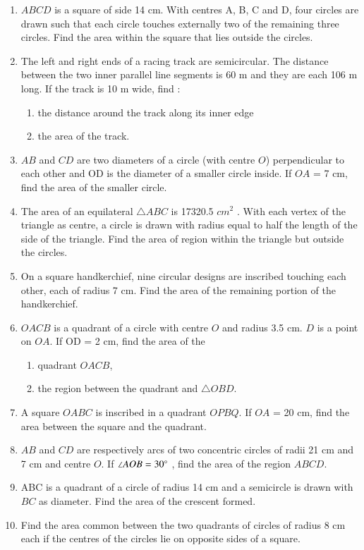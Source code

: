\begin{enumerate}[label=\thesection.\arabic*.,ref=\thesection.\theenumi]
%
\item $ABCD$ is a square of side 14 cm. With centres A, B, C and D, four circles are drawn such that each circle touches externally two of the remaining three circles. Find the area within the square that lies outside the circles.
\item The left and right ends of a racing track are semicircular.
The distance between the two inner parallel line segments is 60 m and they are each 106 m long. If the track is 10 m wide, find : 
\begin{enumerate}
\item the distance around the track along its inner edge 
\item the area of the track.
\end{enumerate}
\item $AB$ and $CD$ are two diameters of a circle (with centre $O$) perpendicular to each other and OD is the diameter of a  smaller circle inside. If $OA$ = 7 cm, find the area of the smaller circle.
\item The area of an equilateral $\triangle ABC$ is 17320.5 $cm^2$
. With each vertex of the triangle as centre, a circle is drawn with radius equal to half the length of the side of the triangle. Find the area of region within the triangle but outside the circles. 
\item On a square handkerchief, nine circular designs are inscribed touching each other, each of radius 7 cm. Find the area of the remaining portion of the handkerchief.
\item $OACB$ is a quadrant of a circle with centre $O$ and radius 3.5 cm. $D$ is a point on $OA$.  If OD = 2 cm, find the area of the
\begin{enumerate}
\item quadrant $OACB$,
 \item the region between the quadrant and $\triangle OBD$.
\end{enumerate}
\item A square $OABC$ is inscribed in a quadrant $OPBQ$. If $OA$ = 20 cm, find the area between the square and the quadrant.
\item $AB$ and $CD$ are respectively arcs of two concentric circles of radii 21 cm and 7 cm and centre $O$.  If  $\angle  AOB = 30 \degree$ , find the area of the region $ABCD$.
\item ABC is a quadrant of a circle of radius 14 cm and a semicircle is drawn with $BC$ as diameter. Find the area of the crescent formed.
\item Find the area common between the two quadrants of circles of radius 8 cm each if the centres of the circles lie on opposite sides of a square.

\end{enumerate}
